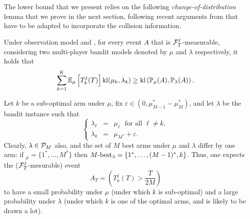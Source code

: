 The lower bound that we present relies on the following \emph{change-of-distribution} lemma that we prove in the next section, following recent arguments from \cite{Garivier16TrueShape} that have to be adapted to incorporate the collision information.


\begin{lemma}\label{lem:5:CD} Under observation model \modelun{} and \modeldeux, for every event $A$ that is $\mathcal{F}_{T}^{j}$-measurable, considering two multi-player bandit models denoted by $\mu$ and $\lambda$ respectively, it holds that
\begin{equation}
  \sum_{k=1}^{K}\mathbb{E}_{\mu}\left[T_k^j(T)\right]\mathrm{kl}(\mu_k,\lambda_k) \geq \mathrm{kl} \left(\mathbb{P}_{\mu}(A),\mathbb{P}_{\lambda}(A)\right).
\end{equation}
\end{lemma}

Let $k$ be a sub-optimal arm under $\mu$,
fix $\varepsilon \in \left(0, \mu_{M-1}^* - \mu_M^*\right)$,
and let $\lambda$ be the bandit instance such that
\[\left\{\begin{array}{ccl}
          \lambda_\ell & = & \mu_\ell \ \ \  \text{for all } \ell \neq k, \\
          \lambda_k & = & \mu_{M^*} + \varepsilon.
         \end{array}
\right.\]
Clearly, $\lambda\in\mathcal{P}_M$ also,
and the set of $M$ best arms under $\mu$ and $\lambda$ differ by one arm: if \Mbest$_{\mu} = \{1^*,\dots,M^*\}$ then $M\text{-}\mathrm{best}_{\lambda} = \{1^*,\dots,(M-1)^*,k\}$.
Thus, one expects the ($\mathcal{F}^j_T$-mesurable) event
\[A_T = \left(T_k^j(T) > \frac{T}{2M}\right)\]
to have a small probability under $\mu$ (under which $k$ is sub-optimal) and a large probability under $\lambda$ (under which $k$ is one of the optimal arms, and is likely to be drawn a lot).

